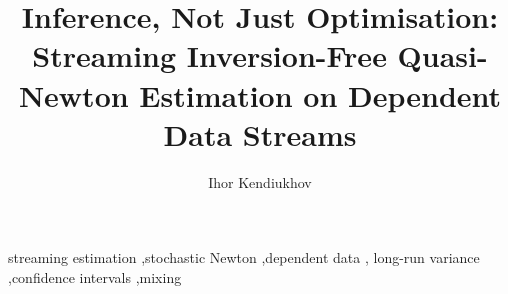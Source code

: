 \documentclass[preprint,11pt,authoryear]{elsarticle}
\theoremstyle{definition}
\begin{document}
\begin{frontmatter}

\title{Inference, Not Just Optimisation: Streaming Inversion-Free
       Quasi-Newton Estimation on Dependent Data Streams}

\author[tue]{Ihor Kendiukhov}


\begin{abstract}

\end{abstract}

\begin{keyword}
streaming estimation \sep stochastic Newton \sep dependent data \sep
long-run variance \sep confidence intervals \sep mixing
\end{keyword}

\end{frontmatter}


\end{document}
